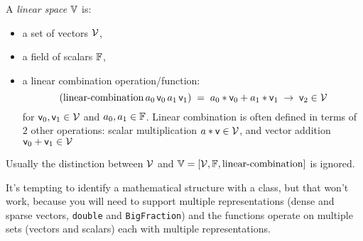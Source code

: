 \documentclass[11pt,openany]{book}
\begin{document}
\begin{example}
\bigskip
A \textit{linear space} ${\mathbb{V}}$ is:
\begin{itemize}
  \item a set of vectors ${\mathcal{V}}$,
  \item a field of scalars ${\mathbb{F}}$,
  \item a linear combination operation/function: 
\begin{equation}
\left( \text{linear-combination} 
\, a_0 \, {\mathsf{v}}_0 \, a_1 \, {\mathsf{v}}_1 \right) \; 
= \; a_0*{\mathsf{v}}_0 + a_1*{\mathsf{v}}_1
\; \rightarrow \; {\mathsf{v}}_2  \in {\mathcal{V}}
\end{equation}
for ${\mathsf{v}}_0, {\mathsf{v}}_1 \in {\mathcal{V}} $
and $a_0, a_1 \in {\mathbb{F}}$.
Linear combination is often defined in terms of
$2$ other operations:
scalar multiplication $a * {\mathsf{v}} \in {\mathcal{V}}$,
and vector addition ${\mathsf{v}}_0 + {\mathsf{v}}_1 \in {\mathcal{V}}$
\end{itemize}
Usually the distinction between ${\mathcal{V}}$ and 
${\mathbb{V}} = \left[ {\mathcal{V}}, {\mathbb{F}}, \text{linear-combination} \right]$
is ignored.
\end{example}

It's tempting to identify a mathematical structure with a class,
but that won't work, because you will need to support multiple
representations (dense and sparse vectors, \texttt{double}
and \texttt{BigFraction}) and the functions
operate on multiple sets (vectors and scalars)
each with multiple representations.
\end{document}
